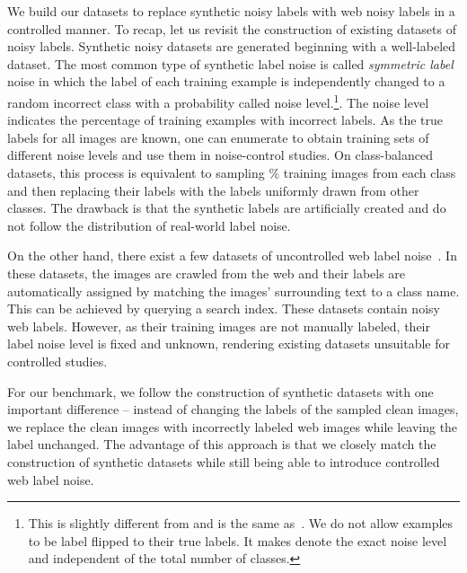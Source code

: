 \documentclass{article}
\begin{document}
We build our datasets to replace synthetic noisy labels with web noisy labels in a controlled manner. To recap, let us revisit the construction of existing datasets of noisy labels. Synthetic noisy datasets are generated beginning with a well-labeled dataset. The most common type of synthetic label noise is called \emph{symmetric label} noise in which the label of each training example is independently changed to a random incorrect class with a probability  called noise level.\footnote{This is slightly different from \citep{zhang2017understanding} and is the same as~\citep{jiang2018mentornet}. We do not allow examples to be label flipped to their true labels. It makes  denote the exact noise level and independent of the total number of classes.}.
The noise level indicates the percentage of training examples with incorrect labels. As the true labels for all images are known, one can enumerate  to obtain training sets of different noise levels and use them in noise-control studies. On class-balanced datasets, this process is equivalent to sampling \% training images from each class and then replacing their labels with the labels uniformly drawn from other classes. The drawback is that the synthetic labels are artificially created and do not follow the distribution of real-world label noise.

On the other hand, there exist a few datasets of uncontrolled web label noise~\citep{xiao2015learning,li2017webvision,krause2016unreasonable}. In these datasets, the images are crawled from the web and their labels are automatically assigned by matching the images' surrounding text to a class name. This can be achieved by querying a search index.
These datasets contain noisy web labels.
However, as their training images are not manually labeled, their label noise level is fixed and unknown, rendering existing datasets unsuitable for controlled studies.

For our benchmark, we follow the construction of synthetic datasets with one important difference -- instead of changing the labels of the sampled clean images, we replace the clean images with incorrectly labeled web images while leaving the label unchanged. The advantage of this approach is that we closely match the construction of synthetic datasets while still being able to introduce controlled web label noise. 
\end{document}
